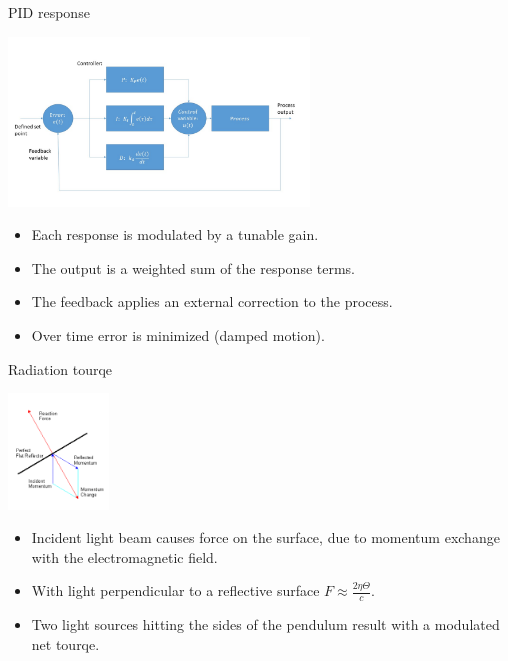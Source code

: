 \documentclass{beamer}
\begin{document}
\begin{frame}{PID response}
	\begin{center}		
		\includegraphics[width=0.6\textwidth,keepaspectratio]{pid_diagram_powerpoint.jpg}
    \end{center}
	\begin{itemize}
	
		\item Each response is modulated by a tunable gain. 
		\item The output is a weighted sum of the response terms.
		\pause
		\item The feedback applies an external correction to the process.	
		\item Over time error is minimized (damped motion).
	\end{itemize}
\end{frame}
\begin{frame}{\hypertarget{frame:Radiation tourqe}{Radiation tourqe}}
	\begin{center}		
		\includegraphics[width=0.2\textwidth,keepaspectratio]{radiation.PNG}
    \end{center}

	
	\begin{itemize}		
		
		\item Incident light beam causes force on the surface, due to momentum exchange with the electromagnetic field.
		\pause
		\item With light perpendicular to a reflective surface $F  \approx\frac{2\eta\Theta}{{c}} $.
		\item Two light sources hitting the sides of the pendulum result with a modulated net tourqe.
		
	\end{itemize}
\end{frame}
\end{document}
